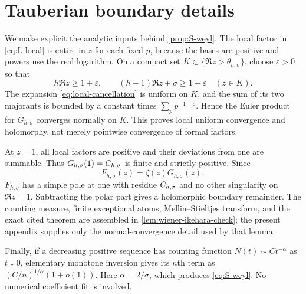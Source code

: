 \section{Tauberian boundary details}
\label{app:tauberian-details}

We make explicit the analytic inputs behind \cref{prop:S-weyl}.  The local
factor in \cref{eq:L-local} is entire in $z$ for each fixed $p$, because
the bases are positive and powers use the real logarithm.  On a compact set
$K\subset\{\Re z>\theta_{h,\sigma}\}$, choose $\varepsilon>0$ so that
\[
  h\Re z\ge1+\varepsilon,
  \qquad
  (h-1)\Re z+\sigma\ge1+\varepsilon
  \quad(z\in K).
\]
The expansion \cref{eq:local-cancellation} is uniform on $K$, and the sum
of its two majorants is bounded by a constant times
$\sum_pp^{-1-\varepsilon}$.  Hence the Euler product for
$G_{h,\sigma}$ converges normally on $K$.  This proves local uniform
convergence and holomorphy, not merely pointwise convergence of formal
factors.

At $z=1$, all local factors are positive and their deviations from one are
summable.  Thus $G_{h,\sigma}(1)=C_{h,\sigma}$ is finite and strictly positive.
Since
\[
  F_{h,\sigma}(z)=\zeta(z)G_{h,\sigma}(z),
\]
$F_{h,\sigma}$ has a simple pole at one with residue $C_{h,\sigma}$ and no other
singularity on $\Re z=1$.  Subtracting the polar part gives a holomorphic
boundary remainder.  The counting measure, finite exceptional atoms,
Mellin--Stieltjes transform, and the exact cited theorem are assembled in
\cref{lem:wiener-ikehara-check}; the present appendix supplies only the
normal-convergence detail used by that lemma.

Finally, if a decreasing positive sequence has counting function
$N(t)\sim C t^{-\alpha}$ as $t\downarrow0$, elementary monotone inversion
gives its $n$th term as $(C/n)^{1/\alpha}(1+o(1))$.  Here
$\alpha=2/\sigma$, which produces \cref{eq:S-weyl}.  No numerical
coefficient fit is involved.
